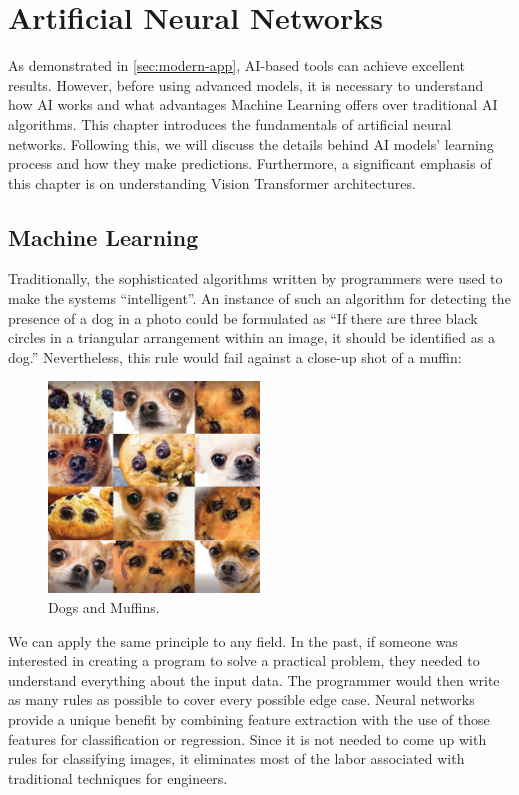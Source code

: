 \chapter{Artificial Neural Networks}
\label{chapter:ann}

As demonstrated in \autoref{sec:modern-app}, AI‑based tools can achieve excellent results. However, before using advanced models, it is necessary to understand how AI works and what advantages Machine Learning offers over traditional AI algorithms. This chapter introduces the fundamentals of artificial neural networks. Following this, we will discuss the details behind AI models' learning process and how they make predictions. Furthermore, a significant emphasis of this chapter is on understanding Vision Transformer architectures.

\section{Machine Learning}

Traditionally, the sophisticated algorithms written by programmers were used to make the systems \enquote{intelligent}. An instance of such an algorithm for detecting the presence of a dog in a photo could be formulated as \enquote{If there are three black circles in a triangular arrangement within an image, it should be identified as a dog.} Nevertheless, this rule would fail against a close-up shot of a muffin:

\begin{figure}[htbp]
    \centering
    \includegraphics[width=0.5\textwidth]{obrazky-figures/02-theoretical-basis/muffin.jpg}
    \caption{Dogs and Muffins.}
    \label{fig:muffin}
\end{figure}

We can apply the same principle to any field. In the past, if someone was interested in creating a program to solve a practical problem, they needed to understand everything about the input data. The programmer would then write as many rules as possible to cover every possible edge case. Neural networks provide a unique benefit by combining feature extraction with the use of those features for classification or regression. Since it is not needed to come up with rules for classifying images, it eliminates most of the labor associated with traditional techniques for engineers.

